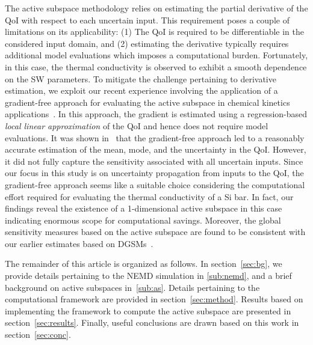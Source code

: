 The active subspace methodology relies on estimating the partial derivative of the QoI 
with respect to each uncertain input. This requirement poses a couple of limitations on its
applicability: (1) The QoI is required to be differentiable in the considered input domain, and (2)
estimating the derivative typically requires additional model evaluations which
imposes a computational burden. Fortunately, in this case,
the thermal conductivity is observed to exhibit a smooth dependence on the SW parameters. 
To mitigate the challenge pertaining to derivative estimation, we exploit our recent experience
involving the application of a gradient-free approach for evaluating the active subspace in
chemical kinetics applications~\cite{Vohra:2018c}. In this approach, the gradient is estimated
using a regression-based \textit{local linear approximation} of the QoI and hence does not require
model evaluations. It was shown in~\cite{Vohra:2018c} that the gradient-free approach
led to a reasonably accurate estimation of the mean, mode, and the uncertainty in the QoI.
However, it did not fully capture the sensitivity associated with all uncertain inputs. Since our focus
in this study is on uncertainty propagation from inputs to the QoI, the gradient-free approach
seems like a suitable choice considering the computational effort required for
evaluating the thermal conductivity of a Si bar. In fact, our findings reveal the existence of a 
1-dimensional active subspace in this case indicating enormous scope for computational savings.
Moreover, the global sensitivity measures based
on the active subspace are found to be consistent with our earlier estimates based on 
DGSMs~\cite{Vohra:2018b}. 

The remainder of this article is organized as follows. In section~\ref{sec:bg}, we provide details
pertaining to the NEMD simulation in \ref{sub:nemd}, and a brief background on active subspaces
in~\ref{sub:as}. Details pertaining to the computational framework are
provided in section~\ref{sec:method}. Results based on implementing the framework to
compute the active subspace
are presented in section~\ref{sec:results}. Finally, useful conclusions are drawn based on this
work in section~\ref{sec:conc}.
































